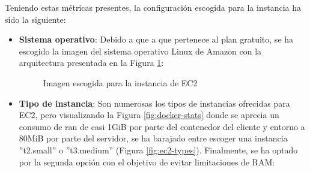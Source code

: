 Teniendo estas métricas presentes, la configuración escogida para la instancia ha sido la siguiente:
\begin{itemize}
    \item \textbf{Sistema operativo}: Debido a que
    a que pertenece al plan gratuito, se ha escogido la imagen del sistema operativo Linux de Amazon con la arquitectura presentada en la Figura \ref{fig:ec2-imagen}:
    \begin{figure}[H]
        \caption{Imagen escogida para la instancia de EC2}
        \label{fig:ec2-imagen}
    \end{figure}
    \item \textbf{Tipo de instancia}: Son numerosas los tipos de instancias ofrecidas para EC2, pero visualizando la Figura \ref{fig:docker-stats} donde se aprecia un consumo de ran de casi 1GiB por parte del contenedor del cliente y entorno a 80MiB por parte del servidor, se ha barajado entre escoger una instancia ''t2.small'' o ''t3.medium'' (Figura \ref{fig:ec2-types}). Finalmente, se ha optado por la segunda opción con el objetivo de evitar limitaciones de RAM:
    \begin{figure}[H]

\end{figure}
\end{itemize}

